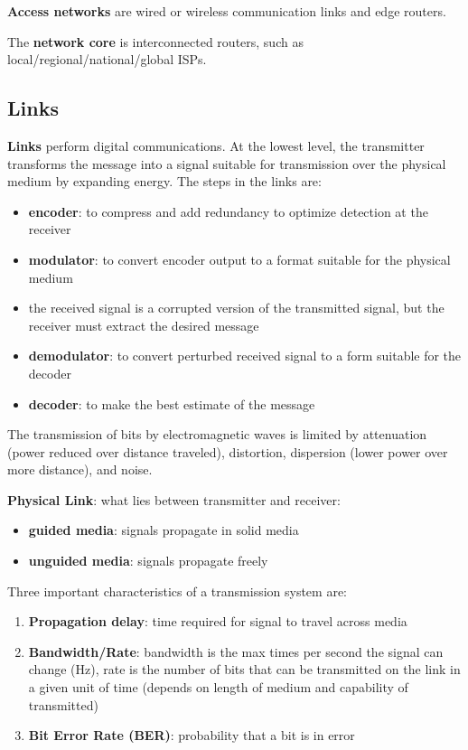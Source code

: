 \documentclass[11pt]{article}
\begin{document}
\textbf{Access networks} are wired or wireless communication links and edge routers.

The \textbf{network core} is interconnected routers, such as local/regional/national/global ISPs.
\subsection{Links}
\label{sec:org5a5a562}

\textbf{Links} perform digital communications. At the lowest level, the transmitter transforms the message
into a signal suitable for transmission over the physical medium by expanding energy.
The steps in the links are:
\begin{itemize}
\item \textbf{encoder}: to compress and add redundancy to optimize detection at the receiver
\item \textbf{modulator}: to convert encoder output to a format suitable for the physical medium
\item the received signal is a corrupted version of the transmitted signal, but the receiver must extract
the desired message
\item \textbf{demodulator}: to convert perturbed received signal to a form suitable for the decoder
\item \textbf{decoder}: to make the best estimate of the message
\end{itemize}

The transmission of bits by electromagnetic waves is limited by attenuation (power reduced over distance
traveled), distortion, dispersion (lower power over more distance), and noise.

\textbf{Physical Link}: what lies between transmitter and receiver:
\begin{itemize}
\item \textbf{guided media}: signals propagate in solid media
\item \textbf{unguided media}: signals propagate freely
\end{itemize}

Three important characteristics of a transmission system are:
\begin{enumerate}
\item \textbf{Propagation delay}: time required for signal to travel across media
\item \textbf{Bandwidth/Rate}: bandwidth is the max times per second the signal can change (Hz), rate is
the number of bits that can be transmitted on the link in a given unit of time (depends on length
of medium and capability of transmitted)
\item \textbf{Bit Error Rate (BER)}: probability that a bit is in error
\end{enumerate}
\end{document}
